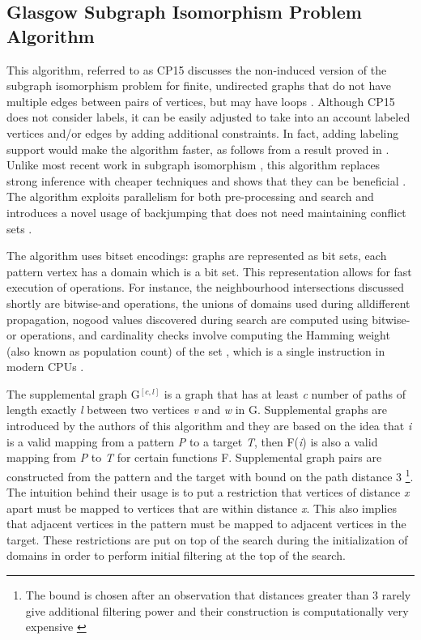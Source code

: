 \documentclass{l4proj}
\begin{document}
\subsection{Glasgow Subgraph Isomorphism Problem Algorithm}
\label{sec:sippatrick}
This algorithm, referred to as CP15 discusses the non-induced version of the subgraph isomorphism problem for finite, undirected graphs that do not have multiple edges between pairs of vertices, but may have loops \cite{CP2015}. Although CP15 does not consider labels, it can be easily adjusted to take into an account labeled vertices and/or edges by adding additional constraints. In fact, adding labeling support would make the algorithm faster, as follows from a result proved in \cite{Ciaran:2016}. Unlike most recent work in subgraph isomorphism \cite{Solnon:2010a,SND}, this algorithm replaces strong inference with cheaper techniques and shows that they can be beneficial \cite{CP2015}. The algorithm exploits parallelism for both pre-processing and search and introduces a novel usage of backjumping \cite{Prosser:1993} that does not need maintaining conflict sets \cite{CP2015}. 

The algorithm uses bitset encodings: graphs are represented as bit sets, each pattern vertex has a domain which is a bit set. This representation allows for fast execution of operations. For instance, the neighbourhood intersections discussed shortly are bitwise-and operations, the unions of domains used during alldifferent propagation, nogood values discovered during search are computed using bitwise-or operations, and cardinality checks involve computing the Hamming weight (also known as population count) of the set \cite{Reed:1954}, which is a single instruction in modern CPUs \cite{CP2015}.  

The supplemental graph G$^{[c,l]}$ is a graph that has at least \emph{c}
number of paths of length exactly \emph{l} between two vertices \emph{v} and \emph{w} in G. Supplemental graphs are introduced by the authors of this algorithm and they are based on the idea that \emph{i} is a valid mapping from a pattern \emph{P} to a target \emph{T}, then F(\emph{i}) is also a valid mapping from \emph{P} to \emph{T} for certain functions F. Supplemental graph pairs are constructed from the pattern and the target with bound on the path distance 3 \footnote{The bound is chosen after an observation that distances greater than 3 rarely give additional filtering power and their construction is computationally very expensive \cite{CP2015}}. The intuition behind their usage is to put a restriction that vertices of distance \emph{x} apart must be mapped to vertices that are within distance \emph{x}. This also implies that adjacent vertices in the pattern must be mapped to adjacent vertices in the target. These restrictions are put on top of the search during the initialization of domains in order to perform initial filtering at the top of the search.
\end{document}
